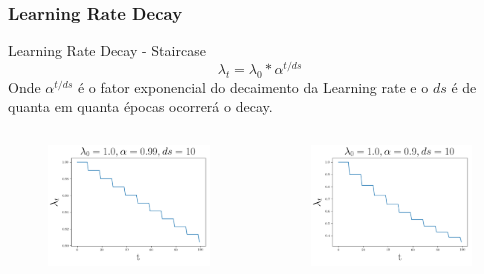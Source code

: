 \documentclass{beamer}
\begin{document}
\begin{frame}
		\frametitle{Learning Rate Decay}
		\begin{block}{Learning Rate Decay - Staircase}
			$$\lambda_t = \lambda_0 *\alpha^{t/ds}$$ 
			Onde $\alpha^{t/ds}$ é o fator exponencial do decaimento da Learning rate e o $ds$ é de quanta em quanta épocas ocorrerá o decay.
			\begin{columns}
				\begin{column}{0.3 \textwidth}
					\begin{figure}
						\centering
						\includegraphics[width=1\linewidth]{figures/lr_decay7.png}
					\end{figure}
				\end{column}
				\begin{column}{0.3 \textwidth}
					\begin{figure}
						\centering
						\includegraphics[width=1\linewidth]{figures/lr_decay8.png}

\end{figure}
\end{column}
\end{columns}
\end{block}
\end{frame}
\end{document}
